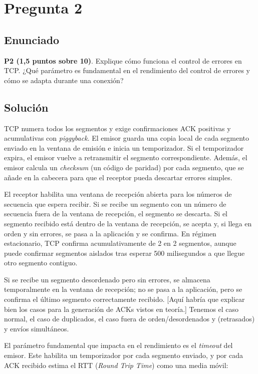 \documentclass[12pt]{article}
\begin{document}
\section{Pregunta 2}

\subsection{Enunciado}

\textbf{P2 (1,5 puntos sobre 10)}. Explique cómo funciona el control de errores en TCP. ¿Qué parámetro es fundamental en el rendimiento del control de errores y cómo se adapta durante una conexión?

\subsection{Solución}

TCP numera todos los segmentos y exige confirmaciones ACK positivas y acumulativas con \textit{piggyback}. El emisor guarda una copia local de cada segmento enviado en la ventana de emisión e inicia un temporizador. Si el temporizador expira, el emisor vuelve a retransmitir el segmento correspondiente. Además, el emisor calcula un \textit{checksum} (un código de paridad) por cada segmento, que se añade en la cabecera para que el receptor pueda descartar errores simples.

El receptor habilita una ventana de recepción abierta para los números de secuencia que espera recibir. Si se recibe un segmento con un número de secuencia fuera de la ventana de recepción, el segmento se descarta. Si el segmento recibido está dentro de la ventana de recepción, se acepta y, si llega en orden y sin errores, se pasa a la aplicación y se confirma. En régimen estacionario, TCP confirma acumulativamente de 2 en 2 segmentos, aunque puede confirmar segmentos aislados tras esperar 500 milisegundos a que llegue otro segmento contiguo. 

Si se recibe un segmento desordenado pero sin errores, se almacena temporalmente en la ventana de recepción; no se pasa a la aplicación, pero se confirma el último segmento correctamente recibido. [Aquí habría que explicar bien los casos para la generación de ACKs vistos en teoría.] Tenemos el caso normal, el caso de duplicados, el caso fuera de orden/desordenados y (retrasados) y envíos simultáneos.

El parámetro fundamental que impacta en el rendimiento es el \textit{timeout} del emisor. Este habilita un temporizador por cada segmento enviado, y por cada ACK recibido estima el RTT (\textit{Round Trip Time}) como una media móvil:
\end{document}
